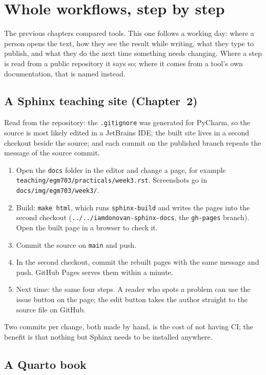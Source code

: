 \chapter{Whole workflows, step by step}

The previous chapters compared tools. This one follows a working day: where a person opens the text, how they see the result while writing, what they type to publish, and what they do the next time something needs changing. Where a step is read from a public repository it says so; where it comes from a tool's own documentation, that is named instead.

\section{A Sphinx teaching site (Chapter~2)}

Read from the repository: the \texttt{.gitignore} was generated for PyCharm, so the source is most likely edited in a JetBrains IDE; the built site lives in a second checkout beside the source; and each commit on the published branch repeats the message of the source commit.
\begin{enumerate}
\item Open the \texttt{docs} folder in the editor and change a page, for example \texttt{teaching/egm703/practicals/week3.rst}. Screenshots go in \texttt{docs/img/egm703/week3/}.
\item Build: \texttt{make html}, which runs \texttt{sphinx-build} and writes the pages into the second checkout (\texttt{../../iamdonovan-sphinx-docs}, the \texttt{gh-pages} branch). Open the built page in a browser to check it.
\item Commit the source on \texttt{main} and push.
\item In the second checkout, commit the rebuilt pages with the same message and push. GitHub Pages serves them within a minute.
\item Next time: the same four steps. A reader who spots a problem can use the issue button on the page; the edit button takes the author straight to the source file on GitHub.
\end{enumerate}
Two commits per change, both made by hand, is the cost of not having CI; the benefit is that nothing but Sphinx needs to be installed anywhere.

\section{A Quarto book}

